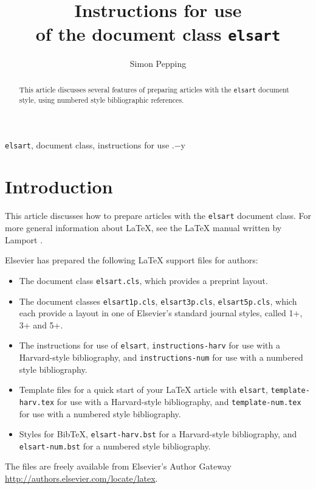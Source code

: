 \documentclass{elsart}
\def\file#1{\texttt{#1}}
\begin{document}
\begin{frontmatter}
\title{Instructions for use\\of the document class \file{elsart}}

\author{Simon Pepping}
\address{Elsevier, P.O. Box 103, 1000 AC Amsterdam,
Netherlands}


\begin{abstract}
This article discusses several features of preparing articles
with the \file{elsart} document style, using numbered style bibliographic
references.
\end{abstract}

\begin{keyword}
\file{elsart}, document class, instructions for use
.$-$y
\end{keyword}
\end{frontmatter}

\section{Introduction}
\label{intro}

This article discusses how to prepare articles with the \file{elsart}
document class.  For more general information about \LaTeX{}, see the
\LaTeX{} manual written by Lamport \cite{Lamp86}.

Elsevier has prepared the following \LaTeX{} support files for
authors:
\begin{itemize}
\item The document class \file{elsart.cls}, which provides a preprint
  layout.
\item The document classes \file{elsart1p.cls}, \file{elsart3p.cls},
  \file{elsart5p.cls}, which each provide a layout in one of
  Elsevier's standard journal styles, called 1+, 3+ and 5+.
\item The instructions for use of \file{elsart},
  \file{instructions-harv} for use with a Harvard-style bibliography,
  and \file{instructions-num} for use with a numbered style
  bibliography.
\item Template files for a quick start of your \LaTeX{} article with
  \file{elsart},
  \newline
  \file{template-harv.tex} for use with a Harvard-style
  bibliography, and
  \newline
  \file{template-num.tex} for use with a numbered
  style bibliography.
\item Styles for BibTeX, \file{elsart-harv.bst} for a Harvard-style
  bibliography, and \file{elsart-num.bst} for a numbered style
  bibliography.
\end{itemize}
The files are freely available from Elsevier's Author Gateway
\url{http://authors.elsevier.com/locate/latex}. 
\end{document}

